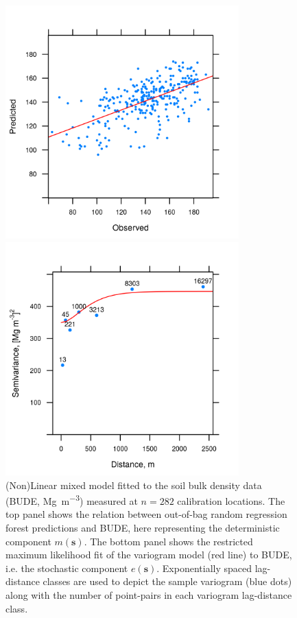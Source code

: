 \begin{figure}[!ht]
 \centering
 \begin{minipage}{90mm}
  \subcaption{}
  \centering
  \includegraphics[width = 90mm]{fig/chap07-random-forest-fit}
  
 \end{minipage}
 \begin{minipage}{90mm}
  \centering
  \subcaption{}
  \includegraphics[width = 90mm]{fig/chap07-bude-vario}

 \end{minipage}
 \caption[(Non)Linear mixed model fitted to the soil bulk density data.]{(Non)Linear mixed model fitted to the 
 soil bulk density data (BUDE, \si{\mega\gram\per\cubic\metre}) measured at $n = 282$ calibration locations. 
 The top panel shows the relation between out-of-bag random regression forest predictions and BUDE, here
 representing the deterministic component $m(\boldsymbol{s})$. The bottom panel shows the restricted maximum 
likelihood fit of the 
 variogram model (red line) to BUDE, i.e. the stochastic component $e(\boldsymbol{s})$. Exponentially spaced
 lag-distance classes are used to depict the sample variogram (blue dots) along with the number of point-pairs
 in each variogram lag-distance class.}
 \label{fig:chap08-bude-vario}
\end{figure}

